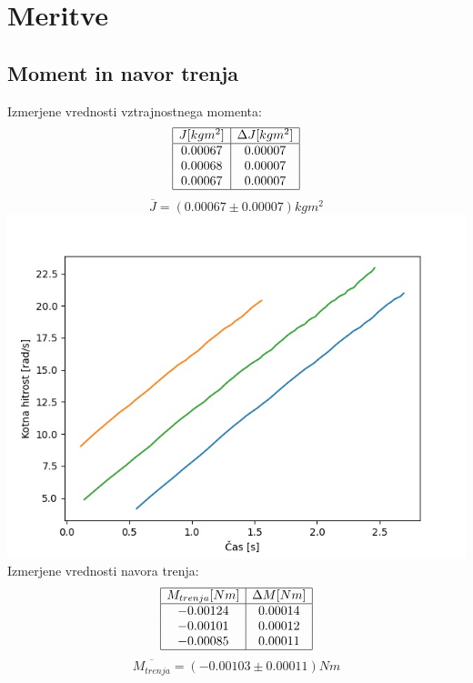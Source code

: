 \documentclass[a4paper]{report}
\begin{document}
\chapter*{Meritve}
\section*{Moment in navor trenja}
Izmerjene vrednosti vztrajnostnega momenta:
\[
\begin{array}{|c|c|}\hline
  J [kg m^2] & \Delta J [kgm^2] \\ \hline
  0.00067 &  0.00007\\
  0.00068 &  0.00007\\
  0.00067 &  0.00007\\
  \hline
\end{array}
\]
\[\overline{J} = (0.00067 \pm 0.00007) kgm^2\]
\vspace{70mm}
\includegraphics[width=\textwidth]{pospesek}
Izmerjene vrednosti navora trenja:
\[
\begin{array}{|c|c|}\hline
  M_{trenja} [Nm] & \Delta M [Nm] \\ \hline
 -0.00124 &  0.00014\\
 -0.00101 &  0.00012\\
 -0.00085 &  0.00011\\
  \hline
\end{array}
\]
\[\overline{M_{trenja}} = (-0.00103 \pm 0.00011) Nm\]
\end{document}
